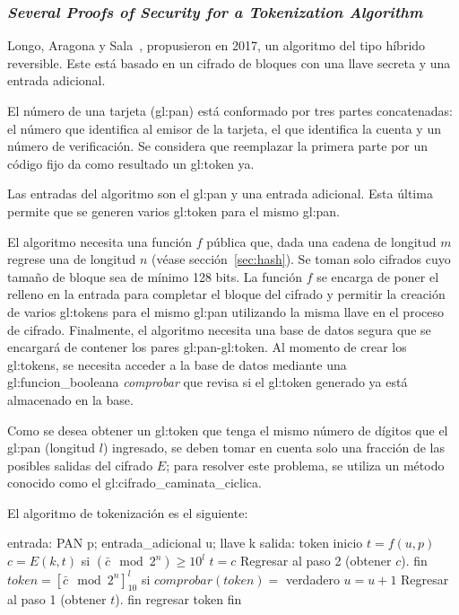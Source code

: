 %
%

\subsubsection{\textit{Several Proofs of Security for a Tokenization
  Algorithm}}

Longo, Aragona y Sala~\cite{aragona}, propusieron en 2017, un algoritmo del
tipo híbrido reversible. Este está basado en un cifrado de bloques con una
llave secreta y una entrada adicional.

El número de una tarjeta (\gls{gl:pan}) está conformado por tres partes
concatenadas: el número que identifica al emisor de la tarjeta, el que
identifica la cuenta y un número de verificación. Se considera que
reemplazar la primera parte por un código fijo da como resultado un
\gls{gl:token} ya.

Las entradas del algoritmo son el \gls{gl:pan} y una entrada adicional.
Esta última permite que se generen varios \gls{gl:token} para el mismo
\gls{gl:pan}.

El algoritmo necesita una función $f$ pública que, dada una cadena
de longitud $m$ regrese una de longitud $n$ (véase sección~\ref{sec:hash}).
Se toman solo cifrados cuyo tamaño de bloque sea de mínimo 128 bits. La
función $f$ se encarga de poner el relleno en la entrada para completar
el bloque del cifrado y permitir la creación de varios \glspl{gl:token}
para el mismo \gls{gl:pan} utilizando la misma llave en el proceso de
cifrado. Finalmente, el algoritmo necesita una base de datos segura que
se encargará de contener los pares \gls{gl:pan}-\gls{gl:token}. Al momento
de crear los \glspl{gl:token}, se necesita acceder a la base de datos
mediante una \gls{gl:funcion_booleana} \textit{comprobar} que revisa si el
\gls{gl:token} generado ya está almacenado en la base.

Como se desea obtener un \gls{gl:token} que
tenga el mismo número de dígitos que el \gls{gl:pan} (longitud $l$)
ingresado, se deben tomar en cuenta solo una fracción de las posibles salidas
del cifrado $E$; para resolver este problema, se utiliza un método conocido
como el \gls{gl:cifrado_caminata_ciclica}.

El algoritmo de tokenización es el siguiente:
\begin{pseudocodigo}[%
    caption={Híbrido reversible, método de tokenización}
  ]
  entrada: PAN p; entrada_adicional u; llave k
  salida:  token
  inicio
    $t = f(u, p)$
    $c = E(k, t)$
    si $(\bar{c} \mod 2^n) \geq 10^l$
      $t = c$
      Regresar al paso 2 (obtener $c$).
    fin
    $token = {[\bar{c} \mod 2^n]}^l_{10}$
    si $comprobar(token) =$ verdadero
      $u = u + 1$
      Regresar al paso 1 (obtener $t$).
    fin
    regresar token
  fin
\end{pseudocodigo}
